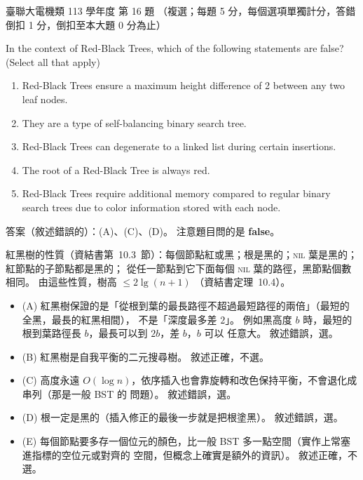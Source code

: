 \begin{pastexam}[label={px:ust-113-ee-ds-16}]{臺聯大電機類 113 學年度 第 16 題}
（複選；每題 5 分，每個選項單獨計分，答錯倒扣 1 分，倒扣至本大題 0 分為止）

In the context of Red-Black Trees, which of the following statements are false? (Select all that
apply)
\begin{enumerate}[label=(\Alph*)]
\item Red-Black Trees ensure a maximum height difference of 2 between any two leaf nodes.
\item They are a type of self-balancing binary search tree.
\item Red-Black Trees can degenerate to a linked list during certain insertions.
\item The root of a Red-Black Tree is always red.
\item Red-Black Trees require additional memory compared to regular binary search trees due to
color information stored with each node.
\end{enumerate}
\end{pastexam}

\begin{pastsoln}
答案（敘述錯誤的）：(A)、(C)、(D)。 注意題目問的是 \textbf{false}。

紅黑樹的性質（資結書第~10.3~節）：每個節點紅或黑；根是黑的；\textsc{nil} 葉是黑的；紅節點的子節點都是黑的；
從任一節點到它下面每個 \textsc{nil} 葉的路徑，黑節點個數相同。 由這些性質，樹高 $\le 2\lg(n+1)$
（資結書定理~10.4）。
\begin{itemize}
\item (A) 紅黑樹保證的是「從根到葉的最長路徑不超過最短路徑的兩倍」（最短的全黑，最長的紅黑相間），
不是「深度最多差 $2$」。 例如黑高度 $b$ 時，最短的根到葉路徑長 $b$，最長可以到 $2b$，差 $b$，$b$ 可以
任意大。 敘述錯誤，選。
\item (B) 紅黑樹是自我平衡的二元搜尋樹。 敘述正確，不選。
\item (C) 高度永遠 $O(\log n)$，依序插入也會靠旋轉和改色保持平衡，不會退化成串列（那是一般 BST 的
問題）。 敘述錯誤，選。
\item (D) 根一定是黑的（插入修正的最後一步就是把根塗黑）。 敘述錯誤，選。
\item (E) 每個節點要多存一個位元的顏色，比一般 BST 多一點空間（實作上常塞進指標的空位元或對齊的
空間，但概念上確實是額外的資訊）。 敘述正確，不選。
\end{itemize}
\end{pastsoln}
